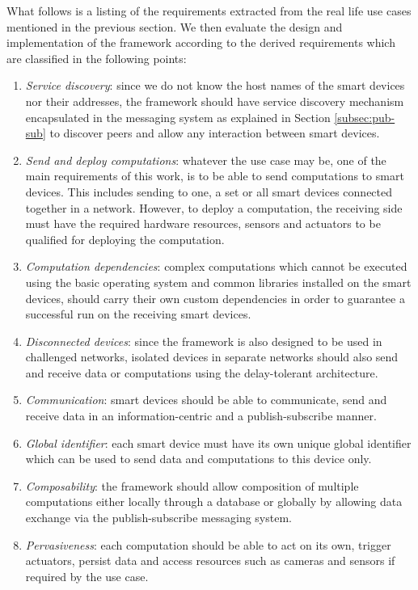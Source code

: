 What follows is a listing of  the requirements extracted from the real life use cases mentioned in the previous section. We then  evaluate the design and implementation of the framework according to the derived requirements which are  classified  in the following points:
\begin{enumerate}
\item \textit{Service discovery}: since we do not know the host names of the smart devices nor their addresses, the framework should have service discovery mechanism encapsulated in the messaging system as explained in Section \ref{subsec:pub-sub}  to discover peers and  allow any interaction between smart devices.
		
\item \textit{Send and deploy computations}: whatever the use case may be, one of the main requirements of this work, is to be able to send computations to smart devices. This includes sending to one, a set or all smart devices connected together in a network. However, to deploy a computation, the receiving side must have the required hardware resources, sensors and actuators to be qualified for deploying the computation.
 
 \item \textit{Computation dependencies}: complex computations which cannot be executed using the basic operating system and common libraries installed on the smart devices, should carry their  own custom dependencies in order to guarantee a successful run on the receiving smart devices. 


\item \textit{Disconnected devices}: since the framework is also designed to be used in challenged networks, isolated devices in separate networks should also send and receive data or computations using the delay-tolerant architecture.


\item \textit{Communication}: smart devices should be able to communicate, send and receive data in an information-centric and a publish-subscribe manner.

\item \textit{Global identifier}: each smart device must have its own unique global identifier which can be used to send data and computations to this device only.

\item \textit{Composability}: the framework should allow composition of multiple computations either locally through a database or globally by allowing data exchange via the publish-subscribe messaging system.

\item \textit{Pervasiveness}: each computation should be able to act on its own, trigger actuators, persist data and access resources such as cameras and sensors if required by the use case.
\end{enumerate}

